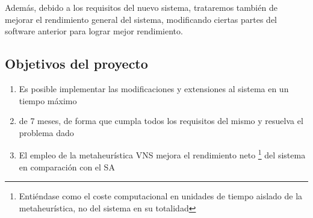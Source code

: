 Además, debido a los requisitos del nuevo sistema, trataremos también de mejorar el rendimiento general del sistema,
modificando ciertas partes del software anterior para lograr mejor rendimiento.

\subsection{Objetivos del proyecto}

\label{sec:mylabel}
\begin{enumerate}[label={H\arabic*}]
    \item[\namedlabel{H1}]  Es posible implementar las modificaciones y extensiones al sistema en un tiempo máximo
    \item de 7 meses, de forma que cumpla todos los requisitos del mismo y resuelva el problema dado %
    \item[\namedlabel{H2}]  El empleo de la metaheurística VNS mejora el rendimiento neto
    \footnote{Entiéndase como el coste computacional en unidades de tiempo aislado de la metaheurística, no del sistema en su totalidad}
    del sistema en comparación con el SA
\end{enumerate}



